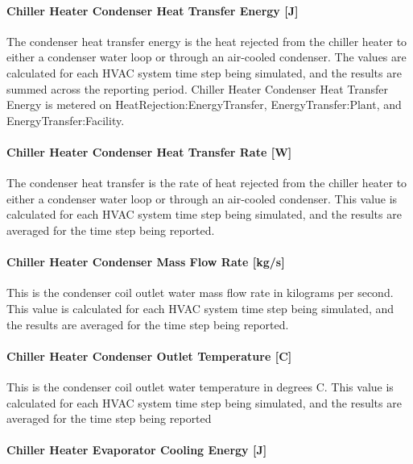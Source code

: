 \paragraph{Chiller Heater Condenser Heat Transfer Energy {[}J{]}}\label{chiller-heater-condenser-heat-transfer-energy-j}

The condenser heat transfer energy is the heat rejected from the chiller heater to either a condenser water loop or through an air-cooled condenser. The values are calculated for each HVAC system time step being simulated, and the results are summed across the reporting period. Chiller Heater Condenser Heat Transfer Energy is metered on HeatRejection:EnergyTransfer, EnergyTransfer:Plant, and EnergyTransfer:Facility.

\paragraph{Chiller Heater Condenser Heat Transfer Rate {[}W{]}}\label{chiller-heater-condenser-heat-transfer-rate-w}

The condenser heat transfer is the rate of heat rejected from the chiller heater to either a condenser water loop or through an air-cooled condenser. This value is calculated for each HVAC system time step being simulated, and the results are averaged for the time step being reported.

\paragraph{Chiller Heater Condenser Mass Flow Rate {[}kg/s{]}}\label{chiller-heater-condenser-mass-flow-rate-kgs}

This is the condenser coil outlet water mass flow rate in kilograms per second. This value is calculated for each HVAC system time step being simulated, and the results are averaged for the time step being reported.

\paragraph{Chiller Heater Condenser Outlet Temperature {[}C{]}}\label{chiller-heater-condenser-outlet-temperature-c}

This is the condenser coil outlet water temperature in degrees C. This value is calculated for each HVAC system time step being simulated, and the results are averaged for the time step being reported

\paragraph{Chiller Heater Evaporator Cooling Energy {[}J{]}}\label{chiller-heater-evaporator-cooling-energy-j}

